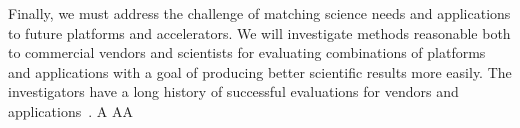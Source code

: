 Finally, we must address the challenge of matching science needs and applications to future
platforms and accelerators. We will investigate methods reasonable both to commercial vendors
and scientists for evaluating combinations of platforms and applications with a goal of producing
better scientific results more easily. The investigators have a long history of successful evaluations
for vendors and 
applications~\cite{Agarwal2008,Bader2008d,Bader2007b,Bader2007c,Bader2007d,Riedy2011b,Agarwal2010,Ye2010,Kang2009,Bader2008a,Bader2007,Madduri2007,Bader2006,Bader2006d,Bader2006j,Bader2005c,tridiag-sisc}.
A
AA
